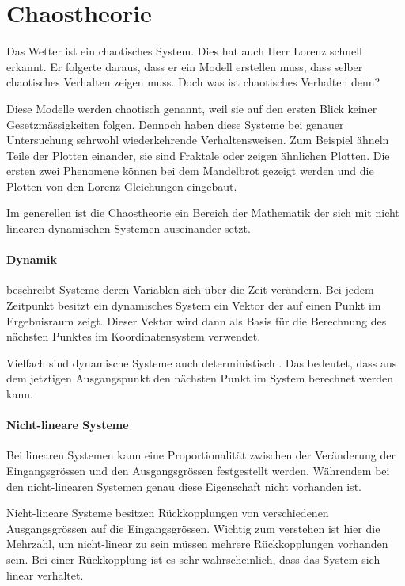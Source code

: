 \documentclass[chaostheorie/chaostheorie.tex]{subfiles}
\begin{document}
	\section{Chaostheorie}
	Das Wetter ist ein chaotisches System. Dies hat auch Herr Lorenz schnell erkannt. Er folgerte daraus, dass er ein Modell erstellen muss, dass selber chaotisches Verhalten zeigen muss. Doch was ist chaotisches Verhalten denn?
	
	Diese Modelle werden chaotisch genannt, weil sie auf den ersten Blick keiner Gesetzmässigkeiten folgen. Dennoch haben diese Systeme bei genauer Untersuchung sehrwohl wiederkehrende Verhaltensweisen. Zum Beispiel ähneln Teile der Plotten einander, sie sind Fraktale oder zeigen ähnlichen Plotten. Die ersten zwei Phenomene können bei dem Mandelbrot gezeigt werden \cite{Gleick} und die Plotten von den Lorenz Gleichungen eingebaut.
	
	Im generellen ist die Chaostheorie ein Bereich der Mathematik der sich mit nicht linearen dynamischen Systemen auseinander setzt.
	
	\paragraph{Dynamik} beschreibt Systeme deren Variablen sich über die Zeit verändern. Bei jedem Zeitpunkt besitzt ein dynamisches System ein Vektor der auf einen Punkt im Ergebnisraum zeigt. Dieser Vektor wird dann als Basis für die Berechnung des nächsten Punktes im Koordinatensystem verwendet.
	
	Vielfach sind dynamische Systeme auch deterministisch \cite{https://en.wikipedia.org/wiki/Dynamical_system}. Das bedeutet, dass aus dem jetztigen Ausgangspunkt den nächsten Punkt im System berechnet werden kann.
	
	
	\paragraph{Nicht-lineare Systeme} %
	Bei linearen Systemen kann eine Proportionalität zwischen der Veränderung der Eingangsgrössen und den Ausgangsgrössen festgestellt werden. Währendem bei den nicht-linearen Systemen genau diese Eigenschaft nicht vorhanden ist.
	
	Nicht-lineare Systeme besitzen Rückkopplungen von verschiedenen Ausgangsgrössen auf die Eingangsgrössen. Wichtig zum verstehen ist hier die Mehrzahl, um nicht-linear zu sein müssen mehrere Rückkopplungen vorhanden sein. Bei einer Rückkopplung ist es sehr wahrscheinlich, dass das System sich linear verhaltet.
	
\end{document}
